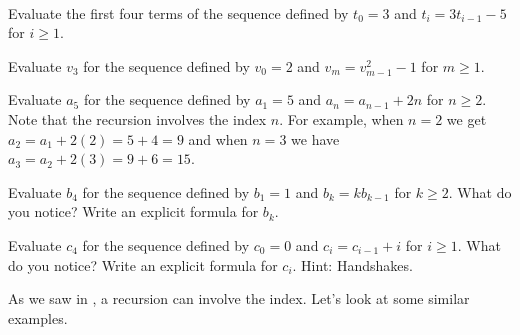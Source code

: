 \begin{act}
\label{act_eval_rec_def_seq}
~
    \begin{actpart}
        \item Evaluate the first four terms of the sequence defined by $t_0=3$ and $t_i=3t_{i-1}-5$ for $i \ge 1$.  %
        \item Evaluate $v_3$ for the sequence defined by $v_0=2$ and $v_m=v_{m-1}^2-1$ for $m \ge 1$. %
        \item Evaluate $a_5$ for the sequence defined by $a_1 = 5$ and $a_n=a_{n-1}+2n$ for $n\ge 2$.  Note that the recursion involves the index $n$.  For example, when $n=2$ we get $a_2=a_1+2(2)=5+4=9$ and when $n=3$ we have $a_3=a_2+2(3)=9+6=15.$
        \item Evaluate $b_4$ for the sequence defined by $b_1=1$ and $b_k=kb_{k-1}$ for $k \ge 2$.  What do you notice? Write an explicit formula for $b_k$.
        \item Evaluate $c_4$ for the sequence defined by $c_0=0$ and $c_i=c_{i-1}+i$ for $i \ge 1$. What do you notice?  Write an explicit formula for $c_i$. Hint: Handshakes.
    \end{actpart}
\end{act}

As we saw in , a recursion can involve the index.  Let's look at some similar examples.

